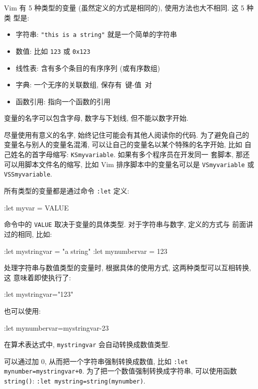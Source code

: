 Vim 有 5 种类型的变量 (虽然定义的方式是相同的), 使用方法也大不相同. 这 5 种类
型是:
\begin{itemize}
    \item 字符串: \texttt{"this is a string"} 就是一个简单的字符串
    \item 数值: 比如 \texttt{123} 或 \texttt{0x123}
    \item 线性表: 含有多个条目的有序序列 (或有序数组)
    \item 字典: 一个无序的关联数组, 保存有\ 键-值\ 对
    \item 函数引用: 指向一个函数的引用
\end{itemize}

变量的名字可以包含字母, 数字与下划线, 但不能以数字开始.

\begin{warning}
    尽量使用有意义的名字, 始终记住可能会有其他人阅读你的代码. 为了避免自己的
    变量名与别人的变量名混淆, 可以让自己的变量名以某个特殊的名字开始, 比如
    自己姓名的首字母缩写: \texttt{KSmyvariable}. 如果有多个程序员在开发同一
    套脚本, 那还可以用脚本文件名的缩写, 比如 Vim 排序脚本中的变量名可以是
    \texttt{VSmyvariable} 或 \texttt{VSSmyvariable}.
\end{warning}

所有类型的变量都是通过命令 \texttt{:let} 定义:
\begin{vimcode}
:let myvar = VALUE
\end{vimcode}
命令中的 \texttt{VALUE} 取决于变量的具体类型. 对于字符串与数字, 定义的方式与
前面讲过的相同, 比如:
\begin{vimcode}
:let mystringvar = "a string"
:let mynumbervar = 123
\end{vimcode}
处理字符串与数值类型的变量时, 根据具体的使用方式, 这两种类型可以互相转换, 这
意味着即使执行了:
\begin{vimcode}
:let mystringvar="123"
\end{vimcode}
也可以使用:
\begin{vimcode}
:let mynumbervar=mystringvar-23
\end{vimcode}
在算术表达式中, \texttt{mystringvar} 会自动转换成数值类型.
\begin{warning}
    可以通过加 0, 从而把一个字符串强制转换成数值, 比如 \texttt{:let
    mynumber=mystringvar+0}. 为了把一个数值强制转换成字符串, 可以使用函数
    \texttt{string()}: \texttt{:let mystring=string(mynumber)}.
\end{warning}

